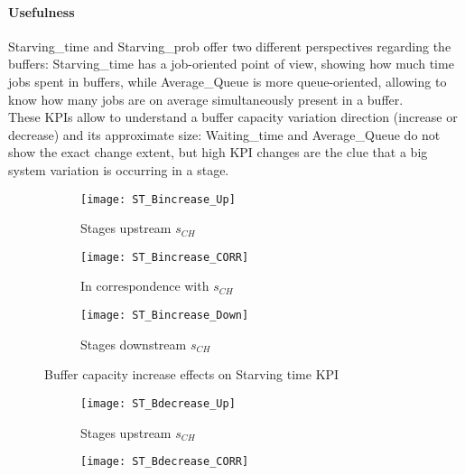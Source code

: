 \paragraph{Usefulness}
Starving\_time and Starving\_prob offer two different perspectives regarding the buffers: Starving\_time has a job-oriented point of view, showing how much time jobs spent in buffers, while Average\_Queue is more queue-oriented, allowing to know how many jobs are on average simultaneously present in a buffer.\\
These KPIs allow to understand a buffer capacity variation direction (increase or decrease) and its approximate size: Waiting\_time and Average\_Queue do not show the exact change extent, but high KPI changes are the clue that a big system variation is occurring in a stage.
\begin{landscape}
\begin{figure}[p]
  \centering
  \begin{subfigure}[t]{0.4\textwidth}
    \texttt{[image: ST\_Bincrease\_Up]}
    \caption{Stages upstream $s_{CH}$}
    \label{fig:Buffer capacity increase effects on Starving time KPI - Stages upstream}   
  \end{subfigure}
  \begin{subfigure}[t]{0.4\textwidth}
    \texttt{[image: ST\_Bincrease\_CORR]}
    \caption{In correspondence with $s_{CH}$}
    \label{fig:Buffer capacity increase effects on Starving time KPI - In correspondence with}   
  \end{subfigure}
  \begin{subfigure}[t]{0.4\textwidth}
    \texttt{[image: ST\_Bincrease\_Down]}
    \caption{Stages downstream $s_{CH}$}
    \label{fig:Buffer capacity increase effects on Starving time KPI - Stages downstream}   
  \end{subfigure}
  \caption{Buffer capacity increase effects on Starving time KPI}
  \label{fig:Buffer capacity increase effects on Starving time KPI}
\end{figure}
\begin{figure}[p]
  \centering
  \begin{subfigure}[b]{0.4\textwidth}
    \texttt{[image: ST\_Bdecrease\_Up]}
    \caption{Stages upstream $s_{CH}$}
    \label{fig:Buffer capacity decrease effects on Starving time KPI - Stages upstream}   
  \end{subfigure}
  \begin{subfigure}[b]{0.4\textwidth}
    \texttt{[image: ST\_Bdecrease\_CORR]}

\end{subfigure}
\end{figure}
\end{landscape}
